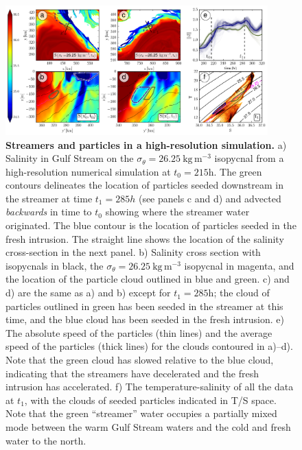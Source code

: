 \documentclass{natureJMK}
\begin{document}
\begin{figure}[htbp]
  \centering
    \includegraphics[width=0.9\textwidth]{./StreamersModel.png}
  \caption{{\bf Streamers and particles in a high-resolution simulation.}
a) Salinity in Gulf Stream on the $\sigma_{\theta}=26.25\  \mathrm{kg\,m^{-3}}$ isopycnal from a high-resolution numerical simulation at $t_0=215 \mathrm{h}$.  The green contours delineates the location of particles seeded downstream in the streamer at time $t_1=285 h$ (see panels c and d) and advected \emph{backwards} in time to $t_0$ showing where the streamer water originated. The blue contour is the location of particles seeded in the fresh intrusion.  The straight line shows the location of the salinity cross-section in the next panel.  b) Salinity cross section with isopycnals in black, the $\sigma_{\theta}=26.25\  \mathrm{kg\,m^{-3}}$ isopycnal in magenta, and the location of the particle cloud outlined in blue and green.  c) and d) are the same as a) and b) except for $t_1=285 \mathrm{h}$; the  cloud of particles outlined in green has been seeded in the streamer at this time, and the blue cloud has been seeded in the fresh intrusion.  e) The absolute speed of the particles (thin lines) and the average speed of the particles (thick lines) for the clouds contoured in a)--d).  Note that the green cloud has slowed relative to the blue cloud, indicating that the streamers have decelerated and the fresh intrusion has accelerated.  f) The temperature-salinity of all the data at $t_1$, with the clouds of seeded particles indicated in T/S space.  Note that the green ``streamer'' water occupies a partially mixed mode between the warm Gulf Stream waters and the cold and fresh water to the north.  
  } \label{fig:StreamersModel}
\end{figure}


\end{document}
